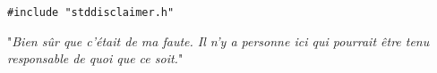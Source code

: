 \texttt{\#include "stddisclaimer.h"}

"\emph{Bien sûr que c'était de ma faute. Il n'y a personne ici qui pourrait être tenu responsable de quoi que ce soit.}"
